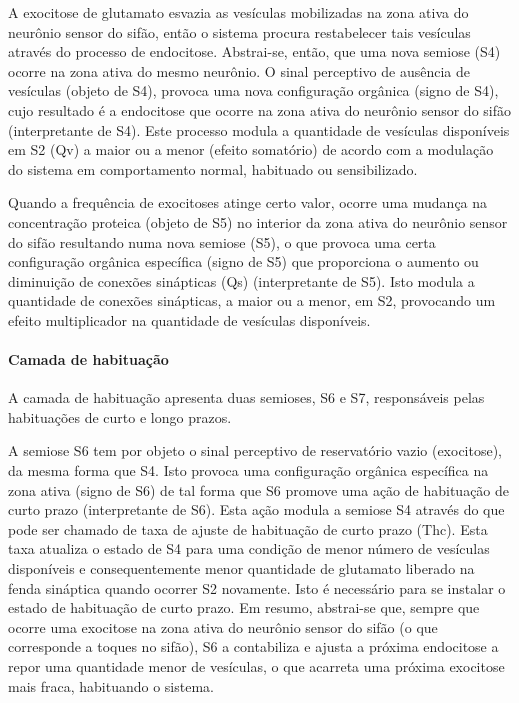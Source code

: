 A exocitose de glutamato esvazia as vesículas mobilizadas na zona ativa do neurônio sensor do sifão, então o sistema procura restabelecer tais vesículas através do processo de endocitose. Abstrai-se, então, que uma nova semiose (S4) ocorre na zona ativa do mesmo neurônio. O sinal perceptivo de ausência de vesículas (objeto de S4), provoca uma nova configuração orgânica (signo de S4), cujo resultado é a endocitose que ocorre na zona ativa do neurônio sensor do sifão (interpretante de S4). Este processo modula a quantidade de vesículas disponíveis em S2 (Qv) a maior ou a menor (efeito somatório) de acordo com a modulação do sistema em comportamento normal, habituado ou sensibilizado.

Quando a frequência de exocitoses atinge certo valor, ocorre uma mudança na concentração proteica (objeto de S5) no interior da zona ativa do neurônio sensor do sifão resultando numa nova semiose (S5), o que provoca uma certa configuração orgânica específica (signo de S5) que proporciona o aumento ou diminuição de conexões sinápticas (Qs) (interpretante de S5). Isto modula a quantidade de conexões sinápticas, a maior ou a menor, em S2, provocando um efeito multiplicador na quantidade de vesículas disponíveis.

\paragraph*{Camada de habituação}

A camada de habituação apresenta duas semioses, S6 e S7, responsáveis pelas habituações de curto e longo prazos.

A semiose S6 tem por objeto o sinal perceptivo de reservatório vazio (exocitose), da mesma forma que S4. Isto provoca uma configuração orgânica específica na zona ativa (signo de S6) de tal forma que S6 promove uma ação de habituação de curto prazo (interpretante de S6). Esta ação modula a semiose S4 através do que pode ser chamado de taxa de ajuste de habituação de curto prazo (Thc).  Esta taxa atualiza o estado de S4 para uma condição de menor número de vesículas disponíveis e consequentemente menor quantidade de glutamato liberado na fenda sináptica quando ocorrer S2 novamente. Isto é necessário para se instalar o estado de habituação de curto prazo. Em resumo, abstrai-se que, sempre que ocorre uma exocitose na zona ativa do neurônio sensor do sifão (o que corresponde a toques no sifão), S6 a contabiliza e ajusta a próxima endocitose a repor uma quantidade menor de vesículas, o que acarreta uma próxima exocitose mais fraca, habituando o sistema.

